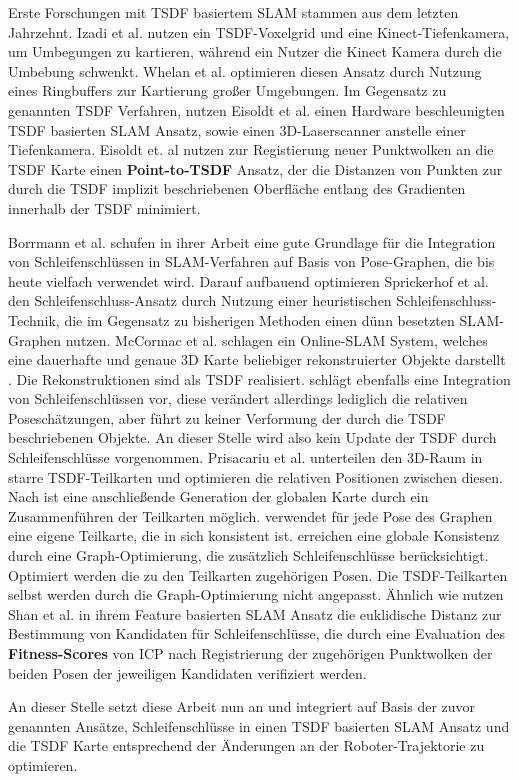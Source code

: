 Erste Forschungen mit TSDF basiertem SLAM stammen aus dem letzten Jahrzehnt.
Izadi et al. \cite{izadi2011kinectfusion} nutzen ein TSDF-Voxelgrid und eine Kinect-Tiefenkamera, um Umbegungen zu kartieren, während ein Nutzer die Kinect Kamera durch die Umbebung schwenkt.
Whelan et al. \cite{whelan2012kintinuous} optimieren diesen Ansatz durch Nutzung eines Ringbuffers zur Kartierung großer Umgebungen.
Im Gegensatz zu genannten TSDF Verfahren, nutzen Eisoldt et al. \cite{HATSDF} einen Hardware beschleunigten TSDF basierten SLAM Ansatz, sowie einen 3D-Laserscanner anstelle einer Tiefenkamera. Eisoldt et. al \cite{HATSDF} nutzen zur Registierung neuer Punktwolken an die TSDF Karte einen \textbf{Point-to-TSDF} Ansatz, der die Distanzen von Punkten zur durch die TSDF implizit beschriebenen Oberfläche entlang des Gradienten innerhalb der TSDF minimiert.

Borrmann et al. \cite{borrmann2008globally} schufen in ihrer Arbeit eine gute Grundlage für die Integration von Schleifenschlüssen in SLAM-Verfahren auf Basis von Pose-Graphen, die bis heute vielfach verwendet wird.
Darauf aufbauend optimieren Sprickerhof et al. \cite{sprickerhof2011heuristic} den Schleifenschluss-Ansatz durch Nutzung einer heuristischen Schleifenschluss-Technik, die im Gegensatz zu bisherigen Methoden einen dünn besetzten SLAM-Graphen nutzen.
McCormac et al. \cite{mccormac2018fusion++} schlagen ein Online-SLAM System, welches eine dauerhafte und genaue 3D Karte beliebiger rekonstruierter Objekte darstellt \cite{mccormac2018fusion++}. Die Rekonstruktionen sind als TSDF realisiert. \cite{mccormac2018fusion++} schlägt ebenfalls eine Integration von Schleifenschlüssen vor, diese verändert allerdings lediglich die relativen Poseschätzungen, aber führt zu keiner Verformung der durch die TSDF beschriebenen Objekte. An dieser Stelle wird also kein Update der TSDF durch Schleifenschlüsse vorgenommen.
Prisacariu et al. \cite{prisacariu2017infinitam} unterteilen den 3D-Raum in starre TSDF-Teilkarten und optimieren die relativen Positionen zwischen diesen. Nach \cite{prisacariu2017infinitam} ist eine anschließende Generation der globalen Karte durch ein Zusammenführen der Teilkarten möglich. \cite{prisacariu2017infinitam} verwendet für jede Pose des Graphen eine eigene Teilkarte, die in sich konsistent ist. \cite{prisacariu2017infinitam} erreichen eine globale Konsistenz durch eine Graph-Optimierung, die zusätzlich Schleifenschlüsse berücksichtigt. Optimiert werden die zu den Teilkarten zugehörigen Posen. Die TSDF-Teilkarten selbst werden durch die Graph-Optimierung nicht angepasst.
Ähnlich wie \cite{borrmann2008globally} nutzen Shan et al. \cite{shan2020lio} in ihrem Feature basierten SLAM Ansatz die euklidische Distanz zur Bestimmung von Kandidaten für Schleifenschlüsse, die durch eine Evaluation des \textbf{Fitness-Scores} von ICP nach Registrierung der zugehörigen Punktwolken der beiden Posen der jeweiligen Kandidaten verifiziert werden.

An dieser Stelle setzt diese Arbeit nun an und integriert auf Basis der zuvor genannten Ansätze, Schleifenschlüsse in einen TSDF basierten SLAM Ansatz und die TSDF Karte entsprechend der Änderungen an der Roboter-Trajektorie zu optimieren.






